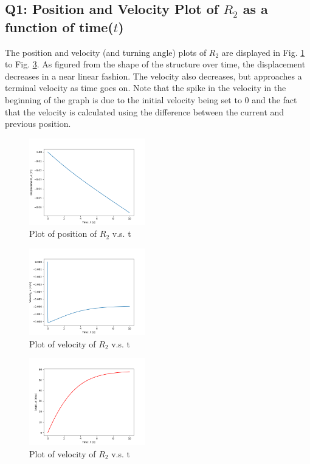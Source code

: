 \documentclass[letterpaper, 10 pt, conference]{ieeeconf}  %
\begin{document}
\subsection*{Q1: Position and Velocity Plot of $R_2$  as a function of time($t$)}

The position and velocity (and turning angle) plots of $R_2$ are displayed in Fig. \ref{"fig:p1q1_position"} to Fig. \ref{"fig:p1q1_angle"}. As figured from the shape of the structure over time, the displacement decreases in a near linear fashion. The velocity also decreases, but approaches a terminal velocity as time goes on. Note that the spike in the velocity in the beginning of the graph is due to the initial velocity being set to 0 and the fact that the velocity is calculated using the difference between the current and previous position.

\begin{figure}[!ht]
        \centering
        \includegraphics[width=0.45\textwidth,keepaspectratio]{p1q1fallingBeam_p1_implicit.png}
        \caption{Plot of position of $R_2$ v.s. t}
        \label{"fig:p1q1_position"}
\end{figure}

\begin{figure}[!ht]
        \centering
        \includegraphics[width=0.45\textwidth,keepaspectratio]{p1q1fallingBeam_velocity_p1_implicit.png}
        \caption{Plot of velocity of $R_2$ v.s. t}
        \label{"fig:p1q1_velocity"}
\end{figure}

\begin{figure}[!ht]
        \centering
        \includegraphics[width=0.45\textwidth,keepaspectratio]{p1q1fallingBeam_angle_p1_implicit.png}
        \caption{Plot of velocity of $R_2$ v.s. t}
        \label{"fig:p1q1_angle"}
\end{figure}
\end{document}
